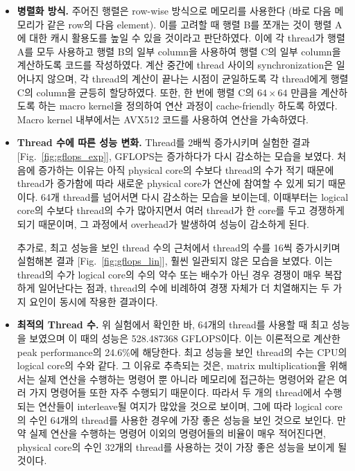 \begin{itemize}

    \item {
        \textbf{병렬화 방식.}
        주어진 행렬은 row-wise 방식으로 메모리를 사용한다 (바로 다음 메모리가 같은 row의 다음 element).
        이를 고려할 때 행렬 B를 쪼개는 것이 행렬 A에 대한 캐시 활용도를 높일 수 있을 것이라고 판단하였다.
        이에 각 thread가 행렬 A를 모두 사용하고 행렬 B의 일부 column을 사용하여 행렬 C의 일부 column을
        계산하도록 코드를 작성하였다.
        계산 중간에 thread 사이의 synchronization은 일어나지 않으며, 각 thread의 계산이 끝나는
        시점이 균일하도록 각 thread에게 행렬 C의 column을 균등히 할당하였다.
        또한, 한 번에 행렬 C의 $64 \times 64$ 만큼을 계산하도록 하는 macro kernel을 정의하여
        연산 과정이 cache-friendly 하도록 하였다. Macro kernel 내부에서는 AVX512 코드를 사용하여
        연산을 가속하였다.
    }
    \item {
        \textbf{Thread 수에 따른 성능 변화.}
        Thread를 2배씩 증가시키며 실험한 결과[Fig.~{\ref{fig:gflops_exp}}],
        GFLOPS는 증가하다가 다시 감소하는 모습을 보였다.
        처음에 증가하는 이유는 아직 physical core의 수보다 thread의 수가 적기 때문에 thread가 증가함에 따라
        새로운 physical core가 연산에 참여할 수 있게 되기 때문이다.
        64개 thread를 넘어서면 다시 감소하는 모습을 보이는데, 이때부터는 logical core의 수보다
        thread의 수가 많아지면서 여러 thread가 한 core를 두고 경쟁하게 되기 때문이며,
        그 과정에서 overhead가 발생하여 성능이 감소하게 된다.

        추가로, 최고 성능을 보인 thread 수의 근처에서 thread의 수를 16씩 증가시키며 실험해본 결과
        [Fig.~{\ref{fig:gflops_lin}}], 훨씬 일관되지 않은 모습을 보였다.
        이는 thread의 수가 logical core의 수의 약수 또는 배수가 아닌 경우 경쟁이 매우 복잡하게 일어난다는 점과,
        thread의 수에 비례하여 경쟁 자체가 더 치열해지는 두 가지 요인이 동시에 작용한 결과이다.
    }
    \item {
        \textbf{최적의 Thread 수.}
        위 실험에서 확인한 바, 64개의 thread를 사용할 때 최고 성능을 보였으며 이 때의 성능은 528.487368 GFLOPS이다.
        이는 이론적으로 계산한 peak performance의 24.6\%에 해당한다.
        최고 성능을 보인 thread의 수는 CPU의 logical core의 수와 같다. 그 이유로 추측되는 것은,
        matrix multiplication을 위해서는 실제 연산을 수행하는 명령어 뿐 아니라
        메모리에 접근하는 명령어와 같은 여러 가지 명령어들 또한 자주 수행되기 때문이다.
        따라서 두 개의 thread에서 수행되는 연산들이 interleave될 여지가 많았을 것으로 보이며,
        그에 따라 logical core의 수인 64개의 thread를 사용한 경우에 가장 좋은 성능을 보인 것으로 보인다.
        만약 실제 연산을 수행하는 명령어 이외의 명령어들의 비율이 매우 적어진다면, 
        physical core의 수인 32개의 thread를 사용하는 것이 가장 좋은 성능을 보이게 될 것이다.

}
\end{itemize}
